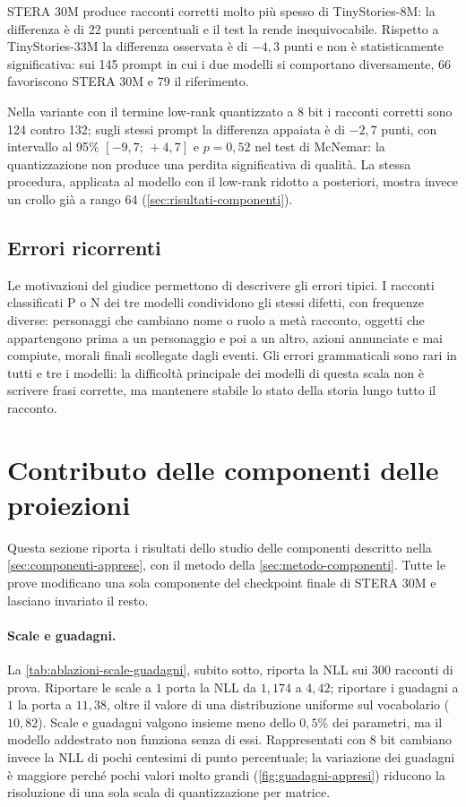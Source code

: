 STERA 30M produce racconti corretti molto più spesso di TinyStories-8M: la differenza è di 22 punti percentuali e il test la rende inequivocabile. Rispetto a TinyStories-33M la differenza osservata è di $-4{,}3$ punti e non è statisticamente significativa: sui 145 prompt in cui i due modelli si comportano diversamente, 66 favoriscono STERA 30M e 79 il riferimento.

Nella variante con il termine low-rank quantizzato a 8 bit i racconti corretti sono 124 contro 132; sugli stessi prompt la differenza appaiata è di $-2{,}7$ punti, con intervallo al 95\% $[-9{,}7;\,+4{,}7]$ e $p=0{,}52$ nel test di McNemar: la quantizzazione non produce una perdita significativa di qualità. La stessa procedura, applicata al modello con il low-rank ridotto a posteriori, mostra invece un crollo già a rango 64 (\autoref{sec:risultati-componenti}).

\subsection{Errori ricorrenti}

Le motivazioni del giudice permettono di descrivere gli errori tipici. I racconti classificati P o N dei tre modelli condividono gli stessi difetti, con frequenze diverse: personaggi che cambiano nome o ruolo a metà racconto, oggetti che appartengono prima a un personaggio e poi a un altro, azioni annunciate e mai compiute, morali finali scollegate dagli eventi. Gli errori grammaticali sono rari in tutti e tre i modelli: la difficoltà principale dei modelli di questa scala non è scrivere frasi corrette, ma mantenere stabile lo stato della storia lungo tutto il racconto.

\section{Contributo delle componenti delle proiezioni}
\label{sec:risultati-componenti}

Questa sezione riporta i risultati dello studio delle componenti descritto nella \autoref{sec:componenti-apprese}, con il metodo della \autoref{sec:metodo-componenti}. Tutte le prove modificano una sola componente del checkpoint finale di STERA 30M e lasciano invariato il resto.

\paragraph{Scale e guadagni.} La \autoref{tab:ablazioni-scale-guadagni}, subito sotto, riporta la NLL sui 300 racconti di prova. Riportare le scale a $1$ porta la NLL da $1{,}174$ a $4{,}42$; riportare i guadagni a $1$ la porta a $11{,}38$, oltre il valore di una distribuzione uniforme sul vocabolario ($10{,}82$). Scale e guadagni valgono insieme meno dello $0{,}5\%$ dei parametri, ma il modello addestrato non funziona senza di essi. Rappresentati con 8 bit cambiano invece la NLL di pochi centesimi di punto percentuale; la variazione dei guadagni è maggiore perché pochi valori molto grandi (\autoref{fig:guadagni-appresi}) riducono la risoluzione di una sola scala di quantizzazione per matrice.


